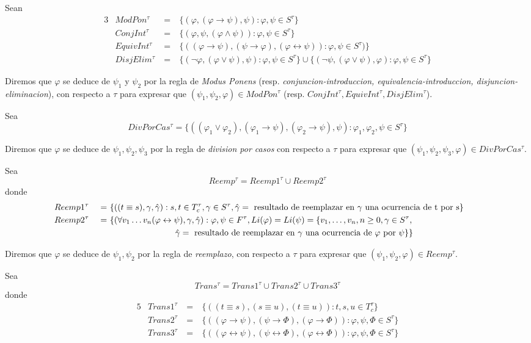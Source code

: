 \begin{definition}
  Sean
  \begin{alignat*}{3}
    &ModPon^\tau &\ =&\ \{(\varphi,(\varphi\rightarrow\psi),\psi):\varphi,\psi\in S^\tau\}\\
    &ConjInt^\tau &\ =&\ \{(\varphi,\psi,(\varphi\land\psi)):\varphi,\psi\in S^\tau\}\\
    &EquivInt^\tau &\ =&\ \{((\varphi\rightarrow\psi),(\psi\rightarrow\varphi),(\varphi\leftrightarrow\psi)):\varphi,\psi\in S^\tau)\}\\
    &DisjElim^\tau &\ =&\ \{(\neg\varphi,(\varphi\lor\psi),\psi):\varphi,\psi\in S^\tau\}\cup\{(\neg\psi,(\varphi\lor\psi),\varphi):\varphi,\psi\in S^\tau\}
  \end{alignat*}

  Diremos que $\varphi$ se deduce de $\psi_1$ y $\psi_2$ por la regla de \emph{Modus Ponens} (resp.
  \emph{conjuncion-introduccion, equivalencia-introduccion, disjuncion-eliminacion}), con respecto a $\tau$ para
  expresar que $(\psi_1,\psi_2,\varphi) \in ModPon^\tau$ (resp. $ConjInt^\tau,EquivInt^\tau,DisjElim^\tau$).

  Sea
  $$
  DivPorCas^\tau = \{((\varphi_1\lor\varphi_2),(\varphi_1\rightarrow\psi),(\varphi_2\rightarrow\psi),\psi):\varphi_1,\varphi_2,\psi\in S^\tau\}
  $$

  Diremos que $\varphi$ se deduce de $\psi_1,\psi_2,\psi_3$ por la regla de \emph{division por casos} con respecto a $\tau$
  para expresar que $(\psi_1,\psi_2,\psi_3,\varphi) \in DivPorCas^\tau$.

  Sea
  $$
  Reemp^\tau = Reemp1^\tau \cup Reemp2^\tau
  $$
  donde 
  \begin{alignat*}{5}
    &Reemp1^\tau &\ =&\ \{((t\equiv s), \gamma,\hat\gamma):s,t\in T_c^\tau, \gamma\in S^\tau, \hat\gamma = \text{ resultado de reemplazar en $\gamma$ una ocurrencia de t por s}\}\\
    &Reemp2^\tau &\ =&\ \{(\forall v_1\dots v_n(\varphi\leftrightarrow\psi),\gamma,\hat\gamma):\varphi,\psi\in F^\tau, Li(\varphi)=Li(\psi)=\{v_{1}, \dots, v_{n}, n\geq 0, \gamma \in S^\tau,&&\\
    & &&\qquad\qquad\qquad\qquad \hat\gamma = \text{ resultado de reemplazar en $\gamma$ una ocurrencia de $\varphi$ por $\psi$}\}\}
  \end{alignat*}

  Diremos que $\varphi$ se deduce de $\psi_1, \psi_2$ por la regla de \emph{reemplazo}, con respecto a $\tau$  para expresar que $(\psi_1,\psi_2,\varphi)\in Reemp^\tau$.

  Sea
  $$
  Trans^\tau = Trans1^\tau \cup Trans2^\tau \cup Trans3^\tau
  $$
  donde 
  \begin{alignat*}{5}
    &Trans1^\tau &\ =&\ \{((t\equiv s),(s\equiv u),(t\equiv u)):t,s,u\in T_c^\tau\}\\
    &Trans2^\tau &\ =&\ \{((\varphi\rightarrow\psi),(\psi\rightarrow\varPhi),(\varphi\rightarrow\varPhi)):\varphi,\psi,\varPhi\in S^\tau\}\\
    &Trans3^\tau &\ =&\ \{((\varphi\leftrightarrow\psi),(\psi\leftrightarrow\varPhi),(\varphi\leftrightarrow\varPhi)):\varphi,\psi,\varPhi\in S^\tau\}
  \end{alignat*}


\end{definition}
